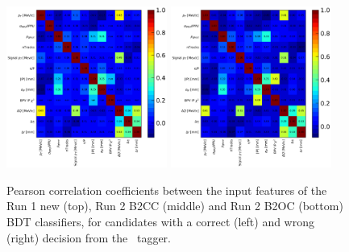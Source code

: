 \begin{figure}[htbp]
\begin{center}
        \includegraphics[width=0.47\textwidth]{04Flavourtagging/figs/OSelectronOpt/2018-04-07-vibattis-OSElectron-bdt-calibration-sWeights_Run2_Bu2D0pi/FeaturesCorrRightTag_RunIIcuts.pdf}
        \includegraphics[width=0.47\textwidth]{04Flavourtagging/figs/OSelectronOpt/2018-04-07-vibattis-OSElectron-bdt-calibration-sWeights_Run2_Bu2D0pi/FeaturesCorrWrongTag_RunIIcuts.pdf} \\
        \end{center}
        \vspace{-2mm}
        \caption{Pearson correlation coefficients between the input features of the Run 1 new (top), Run 2 B2CC (middle) and Run 2 B2OC (bottom) BDT classifiers, for candidates with a correct (left) and wrong (right) decision from the \OSe~tagger.}
         \label{fig:OSecorrelations}
\end{figure}

